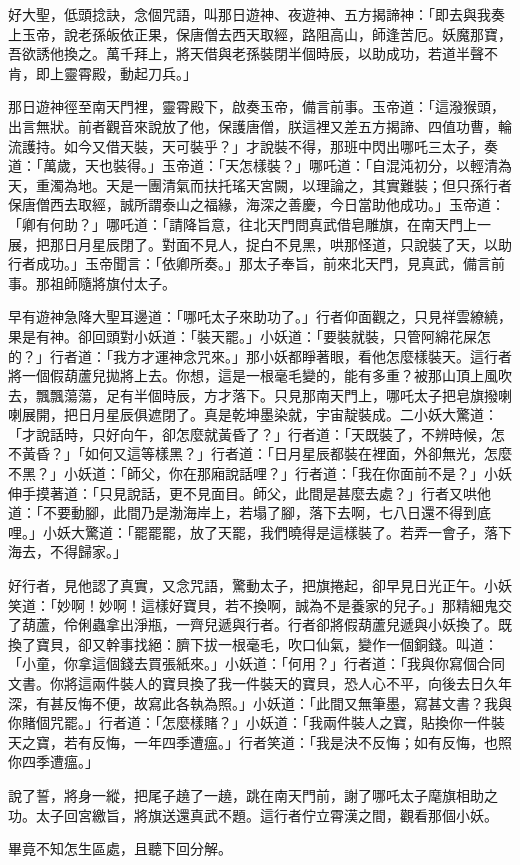 好大聖，低頭捻訣，念個咒語，叫那日遊神、夜遊神、五方揭諦神：「即去與我奏上玉帝，說老孫皈依正果，保唐僧去西天取經，路阻高山，師逢苦厄。妖魔那寶，吾欲誘他換之。萬千拜上，將天借與老孫裝閉半個時辰，以助成功，若道半聲不肯，即上靈霄殿，動起刀兵。」

那日遊神徑至南天門裡，靈霄殿下，啟奏玉帝，備言前事。玉帝道：「這潑猴頭，出言無狀。前者觀音來說放了他，保護唐僧，朕這裡又差五方揭諦、四值功曹，輪流護持。如今又借天裝，天可裝乎？」才說裝不得，那班中閃出哪吒三太子，奏道：「萬歲，天也裝得。」玉帝道：「天怎樣裝？」哪吒道：「自混沌初分，以輕清為天，重濁為地。天是一團清氣而扶托瑤天宮闕，以理論之，其實難裝；但只孫行者保唐僧西去取經，誠所謂泰山之福緣，海深之善慶，今日當助他成功。」玉帝道：「卿有何助？」哪吒道：「請降旨意，往北天門問真武借皂雕旗，在南天門上一展，把那日月星辰閉了。對面不見人，捉白不見黑，哄那怪道，只說裝了天，以助行者成功。」玉帝聞言：「依卿所奏。」那太子奉旨，前來北天門，見真武，備言前事。那祖師隨將旗付太子。

早有遊神急降大聖耳邊道：「哪吒太子來助功了。」行者仰面觀之，只見祥雲繚繞，果是有神。卻回頭對小妖道：「裝天罷。」小妖道：「要裝就裝，只管阿綿花屎怎的？」行者道：「我方才運神念咒來。」那小妖都睜著眼，看他怎麼樣裝天。這行者將一個假葫蘆兒拋將上去。你想，這是一根毫毛變的，能有多重？被那山頂上風吹去，飄飄蕩蕩，足有半個時辰，方才落下。只見那南天門上，哪吒太子把皂旗撥喇喇展開，把日月星辰俱遮閉了。真是乾坤墨染就，宇宙靛裝成。二小妖大驚道：「才說話時，只好向午，卻怎麼就黃昏了？」行者道：「天既裝了，不辨時候，怎不黃昏？」「如何又這等樣黑？」行者道：「日月星辰都裝在裡面，外卻無光，怎麼不黑？」小妖道：「師父，你在那廂說話哩？」行者道：「我在你面前不是？」小妖伸手摸著道：「只見說話，更不見面目。師父，此間是甚麼去處？」行者又哄他道：「不要動腳，此間乃是渤海岸上，若塌了腳，落下去啊，七八日還不得到底哩。」小妖大驚道：「罷罷罷，放了天罷，我們曉得是這樣裝了。若弄一會子，落下海去，不得歸家。」

好行者，見他認了真實，又念咒語，驚動太子，把旗捲起，卻早見日光正午。小妖笑道：「妙啊！妙啊！這樣好寶貝，若不換啊，誠為不是養家的兒子。」那精細鬼交了葫蘆，伶俐蟲拿出淨瓶，一齊兒遞與行者。行者卻將假葫蘆兒遞與小妖換了。既換了寶貝，卻又幹事找絕：臍下拔一根毫毛，吹口仙氣，變作一個銅錢。叫道：「小童，你拿這個錢去買張紙來。」小妖道：「何用？」行者道：「我與你寫個合同文書。你將這兩件裝人的寶貝換了我一件裝天的寶貝，恐人心不平，向後去日久年深，有甚反悔不便，故寫此各執為照。」小妖道：「此間又無筆墨，寫甚文書？我與你賭個咒罷。」行者道：「怎麼樣賭？」小妖道：「我兩件裝人之寶，貼換你一件裝天之寶，若有反悔，一年四季遭瘟。」行者笑道：「我是決不反悔；如有反悔，也照你四季遭瘟。」

說了誓，將身一縱，把尾子趬了一趬，跳在南天門前，謝了哪吒太子麾旗相助之功。太子回宮繳旨，將旗送還真武不題。這行者佇立霄漢之間，觀看那個小妖。

畢竟不知怎生區處，且聽下回分解。
